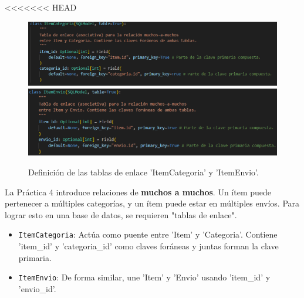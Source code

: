 \documentclass[12pt]{article}
\begin{document}
<<<<<<< HEAD
\begin{figure}[H]
    \centering
    \includegraphics[width=1\textwidth]{Imagenes/Prac4_1.1.png}
    \includegraphics[width=1\textwidth]{Imagenes/Prac4_1.2.png}
    \caption{Definición de las tablas de enlace 'ItemCategoria' y 'ItemEnvio'.}
\end{figure}

La Práctica 4 introduce relaciones de \textbf{muchos a muchos}. Un ítem puede pertenecer a múltiples categorías, y un ítem puede estar en múltiples envíos. Para lograr esto en una base de datos, se requieren "tablas de enlace".
\begin{itemize}
    \item \texttt{ItemCategoria}: Actúa como puente entre 'Item' y 'Categoria'. Contiene 'item\_id' y 'categoria\_id' como claves foráneas y juntas forman la clave primaria.
    \item \texttt{ItemEnvio}: De forma similar, une 'Item' y 'Envio' usando 'item\_id' y 'envio\_id'.
\end{itemize}
\end{document}
